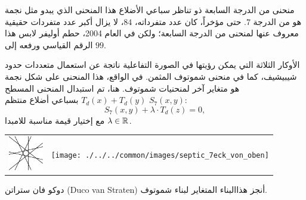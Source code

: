 \begin{surferPage}[7-gon]{منحنى من الدرجة السابعة ذو تناظر سباعي الأضلاع}
هذا المنحنى الذي يبدو مثل نجمة هو من الدرجة $7$. 
   حتى مؤخراً، كان عدد متفرداته، $84$، لا يزال أكبر عدد متفردات حقيقية معروف عنها لمنحنى من الدرجة السابعة؛ 
   ولكن في العام 2004، حطم أوليفر لابس هذا الرقم القياسي ورفعه إلى $99$.  
  
    الأوكار الثلاثة التي يمكن رؤيتها في الصورة التفاعلية ناتجة عن استعمال متعددات حدود شيبيشيف، كما في منحنى شموتوف المثمن.  
    في الواقع، هذا المنحنى على شكل نجمة هو متغاير آخر لمنحنيات شموتوف.
    هنا، تم استبدال المنحنى المسطح $T_d(x)+T_d(y)$ بسباعي أضلاع منتظم $S_7(x,y)$: 
   \[S_7(x,y) + \lambda \cdot T_d(z) = 0,\]
   مع إختيار قيمة مناسبة للامبدا  $\lambda\in{\mathbb R}$. 
    \vspace*{-0.3em}
    \begin{center}
      \begin{tabular}{c@{\qquad}c}
        \includegraphics[height=1.5cm]{./../../common/images/labsseptic1.pdf}
        &
        \texttt{[image: ./../../common/images/septic\_7eck\_von\_oben]}
      \end{tabular}
    \end{center}
    \vspace*{-0.3em}   
    دوكو فان ستراتن (Duco van Straten) أنجز هذاالبناء المتغاير لبناء شموتوف.
\end{surferPage}
